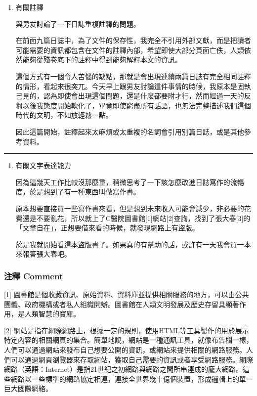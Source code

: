 \documentclass[
]{article}
\begin{document}
\begin{enumerate}
\def\labelenumi{\arabic{enumi}.}
\item
  有關註釋

  與男友討論了一下日誌重複註釋的問題。

  在前面九篇日誌中，為了文件的保存性，我完全不引用外部文獻，而是把讀者可能需要的資訊都包含在文件的註釋內部，希望即使大部分頁面亡佚，人類依然能夠從殘卷底下的註釋中得到能夠解釋本文的資訊。

  這個方式有一個令人苦惱的缺點，那就是會出現連續兩篇日誌有完全相同註釋的情形，看起來很突兀。今天早上跟男友討論這件事情的時候，我原本是固執己見的，認為即使會出現這個問題，還是什麼都要附才行，然而經過一天的反芻以後我態度開始軟化了，畢竟即使窮盡所有話語，也無法完整描述我們這個時代的文明，不如放輕鬆一點。

  因此這篇開始，註釋起來太麻煩或太重複的名詞會引用別篇日誌，或是其他參考資料。
\end{enumerate}

\begin{center}\rule{0.5\linewidth}{\linethickness}\end{center}

\begin{enumerate}
\def\labelenumi{\arabic{enumi}.}
\setcounter{enumi}{1}
\item
  有關文字表達能力

  因為這幾天工作比較沒那麼重，稍微思考了一下該怎麼改進日誌寫作的流暢度，於是想到了有一種東西叫做寫作書。

  原本想要直接買一些寫作書來看，但是想到未來收入可能會減少，非必要的花費還是不要亂花，所以就上了C醫院圖書館{[}1{]}網站{[}2{]}查詢，找到了張大春{[}3{]}的「文章自在」，正想要借來看的時候，就發現網路上有盜版。

  於是我就開始看這本盜版書了。如果真的有幫助的話，或許有一天我會買一本來報答張大春吧。
\end{enumerate}

\hypertarget{ux6ce8ux91cb-comment-3}{%
\subsubsection{注釋 Comment}\label{ux6ce8ux91cb-comment-3}}

{[}1{]}
圖書館是個收藏資訊、原始資料、資料庫並提供相關服務的地方，可以由公共團體、政府機構或者私人組織開辦。圖書館在人類文明發展及歷史存留具顯著作用，是人類智慧的寶庫。

{[}2{]}
網站是指在網際網路上，根據一定的規則，使用HTML等工具製作的用於展示特定內容的相關網頁的集合。簡單地說，網站是一種通訊工具，就像布告欄一樣，人們可以通過網站來發布自己想要公開的資訊，或網站來提供相關的網路服務。人們可以通過網頁瀏覽器來存取網站，獲取自己需要的資訊或者享受網路服務。網際網路（英語：Internet）是指21世紀之初網路與網路之間所串連成的龐大網路。這些網路以一些標準的網路協定相連，連接全世界幾十億個裝置，形成邏輯上的單一巨大國際網絡。
\end{document}
